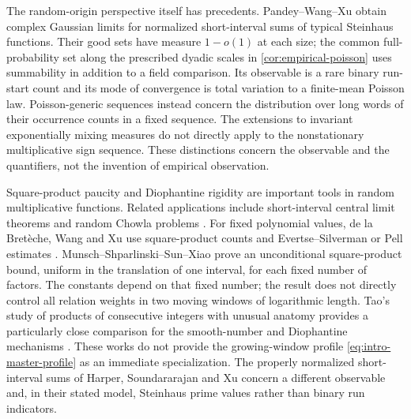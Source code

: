 The random-origin perspective itself has precedents.
Pandey--Wang--Xu \cite[arXiv version 4, Theorem~1.2]{PandeyWangXu2024} obtain complex
Gaussian limits for normalized short-interval sums of typical Steinhaus
functions. Their good sets have measure $1-o(1)$ at each size; the
common full-probability set along the prescribed dyadic scales in
\cref{cor:empirical-poisson} uses summability in addition to a field
comparison. Its observable is a rare binary run-start count and its
mode of convergence is total variation to a finite-mean Poisson law.
Poisson-generic sequences \cite{AlvarezBecherMereb2023} instead concern
the distribution over long words of their occurrence counts in a fixed
sequence. The extensions to invariant exponentially mixing measures
\cite{AlvarezEtAlPoissonGenericity} do not directly apply to the nonstationary
multiplicative sign sequence. These distinctions concern the observable
and the quantifiers, not the invention of empirical observation.

Square-product paucity and Diophantine rigidity are important tools in random
multiplicative functions. Related applications include short-interval central
limit theorems and random Chowla problems
\cite{ChatterjeeSoundararajan2012,SoundararajanXu2023,KlurmanShkredovXu2023,ChinisShala2025}. For fixed polynomial values, de la Bret\`eche, Wang and Xu
use square-product counts and Evertse--Silverman or Pell estimates
\cite{deLaBretecheWangXu2026}. Munsch--Shparlinski--Sun--Xiao
\cite[Theorem~1.3]{MunschShparlinskiSunXiao2026} prove an unconditional
square-product bound, uniform in the translation of one interval, for
each fixed number of factors. The constants depend on that fixed number;
the result does not directly control all relation weights in two moving
windows of logarithmic length. Tao's study of products of consecutive integers
with unusual anatomy provides a particularly close comparison for the
smooth-number and Diophantine mechanisms \cite{Tao2026}.
These works do not provide the growing-window profile
\eqref{eq:intro-master-profile} as an immediate specialization.
The properly normalized short-interval sums of Harper, Soundararajan and Xu
\cite{HarperSoundararajanXu2026} concern a different observable and, in their
stated model, Steinhaus prime values rather than binary run indicators.

